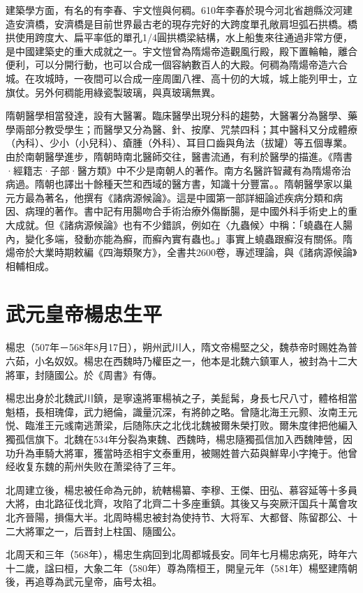 建築學方面，有名的有李春、宇文愷與何稠。610年李春於現今河北省趙縣洨河建造安濟橋，安濟橋是目前世界最古老的現存完好的大跨度單孔敞肩坦弧石拱橋。橋拱使用跨度大、扁平率低的單孔1/4圓拱橋梁結構，水上船隻來往通過非常方便，是中國建築史的重大成就之一。宇文愷曾為隋煬帝造觀風行殿，殿下置輪軸，離合便利，可以分開行動，也可以合成一個容納數百人的大殿。何稠為隋煬帝造六合城。在攻城時，一夜間可以合成一座周圍八裡、高十仞的大城，城上能列甲士，立旗仗。另外何稠能用綠瓷製玻璃，與真玻璃無異。

隋朝醫學相當發達，設有大醫署。臨床醫學出現分科的趨勢，大醫署分為醫學、藥學兩部分教受學生；而醫學又分為醫、針、按摩、咒禁四科；其中醫科又分成體療（內科）、少小（小兒科）、瘡腫（外科）、耳目口齒與角法（拔罐）等五個專業。由於南朝醫學進步，隋朝時南北醫師交往，醫書流通，有利於醫學的描進。《隋書·經籍志·子部·醫方類》中不少是南朝人的著作。南方名醫許智藏有為隋煬帝治病過。隋朝也譯出十餘種天竺和西域的醫方書，知識十分豐富。。隋朝醫學家以巢元方最為著名，他撰有《諸病源候論》。這是中國第一部詳細論述疾病分類和病因、病理的著作。書中記有用腸吻合手術治療外傷斷腸，是中國外科手術史上的重大成就。但《諸病源候論》也有不少錯誤，例如在〈九蟲候〉中稱：「蟯蟲在人腸內，變化多端，發動亦能為癬，而癬內實有蟲也。」事實上蟯蟲跟癬沒有關係。隋煬帝於大業時期敕編《四海類聚方》，全書共2600卷，專述理論，與《諸病源候論》相輔相成。

\section{武元皇帝楊忠生平}

楊忠（507年－568年8月17日），朔州武川人，隋文帝楊堅之父，魏恭帝时赐姓為普六茹，小名奴奴。楊忠在西魏時乃權臣之一，他本是北魏六鎮軍人，被封為十二大將軍，封隨國公。於《周書》有傳。

楊忠出身於北魏武川鎮，是寧遠將軍楊禎之子，美髭髯，身長七尺八寸，體格相當魁梧，長相瑰偉，武力絕倫，識量沉深，有將帥之略。曾隨北海王元颢、汝南王元悦、臨淮王元彧南逃萧梁，后随陈庆之北伐北魏被爾朱榮打败。爾朱度律把他編入獨孤信旗下。北魏在534年分裂為東魏、西魏時，楊忠隨獨孤信加入西魏陣營，因功升為車騎大將軍，獲當時丞相宇文泰重用，被賜姓普六茹與鮮卑小字掩于。他曾经收复东魏的荊州失败在萧梁待了三年。

北周建立後，楊忠被任命為元帥，統轄楊纂、李穆、王傑、田弘、慕容延等十多員大將，由北路征伐北齊，攻陷了北齊二十多座重鎮。其後又与突厥汗国兵十萬會攻北齐晉陽，損傷大半。北周時楊忠被封為使持节、大将军、大都督、陈留郡公、十二大將軍之一，后晋封上柱国、隨國公。

北周天和三年（568年），楊忠生病回到北周都城長安。同年七月楊忠病死，時年六十二歲，諡曰桓，大象二年（580年）尊為隋桓王，開皇元年（581年）楊堅建隋朝後，再追尊為武元皇帝，庙号太祖。






